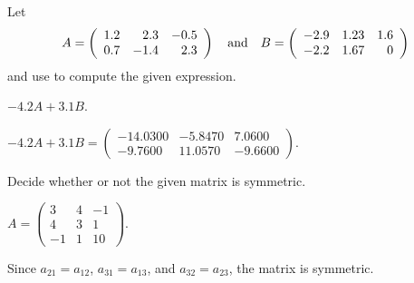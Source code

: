 \documentclass{ximera}
\begin{document}
\matlabproblemlabel

\noindent Let  \[ A = \left(\begin{array}{rrr} 1.2 & 2.3 & -0.5\\ 0.7 & -1.4 & 2.3 \end{array}\right) \quad\mbox{and}\quad B = \left(\begin{array}{rrr} -2.9 & 1.23 & 1.6\\ -2.2 & 1.67 & 0 \end{array}\right) \] and use \Matlab to compute the given expression.

\begin{computerExercise}  \label{c1.2.4a}
$-4.2A+3.1B$.

\begin{solution}
$-4.2A + 3.1B = \left(\begin{array}{rrr} 
-14.0300 & -5.8470 &    7.0600 \\
 -9.7600 & 11.0570 &   -9.6600\end{array}\right)$.

\end{solution}
\end{computerExercise}





\problemlabel

\noindent Decide whether or not the given matrix is symmetric.

\begin{exercise} \label{c1.1.01e}
 $A = \left( \begin{array}{rrr}
 3 & 4 & -1\\
 4 & 3 &  1\\
 -1 & 1 & 10\end{array} \right)$.
  \begin{multipleChoice}
  \end{multipleChoice}
       

\begin{solution}
Since $a_{21} = a_{12}$, $a_{31} = a_{13}$, and $a_{32} = a_{23}$, the matrix is symmetric.

\end{solution}
\end{exercise}


\end{document}
